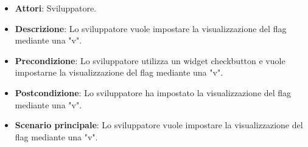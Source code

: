 
\FloatBarrier
\begin{itemize}
\item\textbf{Attori}: Sviluppatore.
\item\textbf{Descrizione}: Lo sviluppatore vuole impostare la visualizzazione del flag mediante una "v".
\item\textbf{Precondizione}: Lo sviluppatore utilizza un widget checkbutton e vuole impostarne la visualizzazione del flag mediante una "v".
\item\textbf{Postcondizione}: Lo sviluppatore ha impostato la visualizzazione del flag mediante una "v".
\item\textbf{Scenario principale}: Lo sviluppatore vuole impostare la visualizzazione del flag mediante una "v".
\end{itemize}
